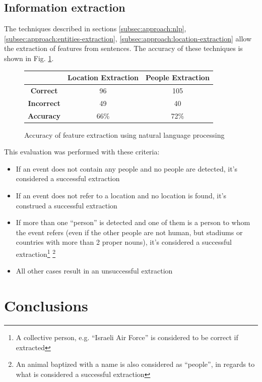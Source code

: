 \documentclass{llncs}
\begin{document}
\subsection{Information extraction}

The techniques described in sections \ref{subsec:approach:nlp}, \ref{subsec:approach:entities-extraction}, \ref{subsec:approach:location-extraction} allow the extraction of features from sentences. The accuracy of these techniques is shown in Fig. \ref{fig:feature-extraction-accuracy}.

\begin{figure}[h!]
	\centering
	\begin{tabular}{c|c|c}
		& \textbf{Location Extraction} & \textbf{People Extraction} \\
		\hline
		\textbf{Correct}   & 96 & 105 \\
		\textbf{Incorrect} & 49 & 40 \\
		\hline
		\textbf{Accuracy}  & 66\% & 72\% \\ 
	\end{tabular}
	\caption{Accuracy of feature extraction using natural language processing}
	\label{fig:feature-extraction-accuracy}
\end{figure}

This evaluation was performed with these criteria:

\begin{itemize}
	\item If an event does not contain any people and no people are detected, it's considered a successful extraction
	\item If an event does not refer to a location and no location is found, it's construed a successful extraction
	\item If more than one ``person'' is detected and one of them is a person to whom the event refers (even if the other people are not human, but stadiums or countries with more than 2 proper nouns), it's considered a successful extraction\footnote{A collective person, e.g. ``Israeli Air Force'' is considered to be correct if extracted} \footnote{An animal baptized with a name is also considered as ``people'', in regards to what is considered a successful extraction}
	\item All other cases result in an unsuccessful extraction
\end{itemize}

\section{Conclusions}
\end{document}
